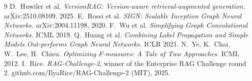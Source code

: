 \documentclass[10pt,a4paper]{article}
\begin{document}
\begin{thebibliography}{9}\small
{} D.~Huwiler et al. \emph{VersionRAG: Version-aware retrieval-augmented generation.} arXiv:2510.08109, 2025.
 E.~Rossi et al. \emph{SIGN: Scalable Inception Graph Neural Networks.} arXiv:2004.11198, 2020.
 F.~Wu et al. \emph{Simplifying Graph Convolutional Networks.} ICML 2019.
 Q.~Huang et al. \emph{Combining Label Propagation and Simple Models Out-performs Graph Neural Networks.} ICLR 2021.
 N.~Ye, K.~Chai, W.~Lee, H.~Chieu. \emph{Optimizing F-measures: A Tale of Two Approaches.} ICML 2012.
 I.~Rice. \emph{RAG-Challenge-2}, winner of the Enterprise RAG Challenge round 2. github.com/IlyaRice/RAG-Challenge-2 (MIT), 2025.
\end{thebibliography}
\end{document}
